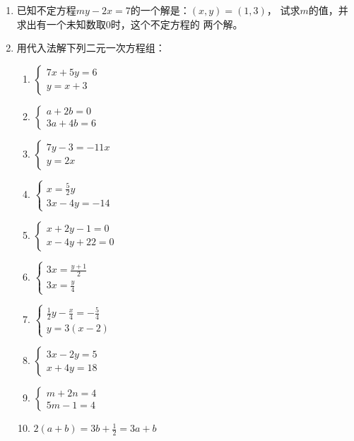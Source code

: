 \begin{enumerate}
\item 已知不定方程$my-2x=7$的一个解是：$(x,y)=(1,3)$，
试求$m$的值，并求出有一个未知数取0时，这个不定方程的
两个解。
\item 用代入法解下列二元一次方程组：
\begin{multicols}{2}
\begin{enumerate}
    \item $\begin{cases}
        7x+5y=6\\ y=x+3
    \end{cases}$
    \item $\begin{cases}
        a+2b=0\\ 3a+4b=6
    \end{cases}$
    \item $\begin{cases}
        7y-3=-11x\\ y=2x
    \end{cases}$
    \item $\begin{cases}
x=\frac{5}{2}y\\ 3x-4y=-14        
    \end{cases}$
    \item $\begin{cases}
        x+2y-1=0\\ x-4y+22=0
    \end{cases}$
    \item $\begin{cases}
        3x=\frac{y+1}{2}\\ 3x=\frac{y}{4}
    \end{cases}$
    \item $\begin{cases}
        \frac{1}{2}y-\frac{x}{4}=-\frac{5}{4}\\y=3(x-2)
    \end{cases}$
    \item $\begin{cases}
        3x-2y=5\\ x+4y=18
    \end{cases}$
    \item $\begin{cases}
        m+2n=4\\5m-1=4
    \end{cases}$
    \item $2(a+b)=3b+\frac{1}{2}=3a+b$
\end{enumerate}
\end{multicols}


\end{enumerate}
